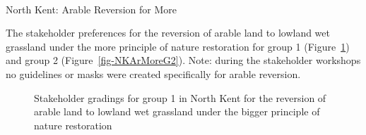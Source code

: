 \documentclass[
  12pt,
  letterpaper,
  DIV=11,
  numbers=noendperiod]{scrartcl}
\makeatletter
\let\oldparagraph\paragraph
\renewcommand{\paragraph}{
    \@ifstar
      \xxxParagraphStar
      \xxxParagraphNoStar
  }
\newcommand{\xxxParagraphStar}[1]{\oldparagraph*{#1}\mbox{}}
\newcommand{\xxxParagraphNoStar}[1]{\oldparagraph{#1}\mbox{}}
\makeatother
\begin{document}
\newpage{}

\paragraph{North Kent: Arable Reversion for
More}\label{north-kent-arable-reversion-for-more}

The stakeholder preferences for the reversion of arable land to lowland
wet grassland under the more principle of nature restoration for group 1
(Figure~\ref{fig-NKArMoreG1}) and group 2 (Figure~\ref{fig-NKArMoreG2}).
Note: during the stakeholder workshops no guidelines or masks were
created specifically for arable reversion.

\begin{figure}[H]


\caption{\label{fig-NKArMoreG1}Stakeholder gradings for group 1 in North
Kent for the reversion of arable land to lowland wet grassland under the
bigger principle of nature restoration}

\end{figure}%
\end{document}
